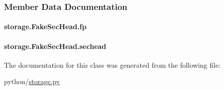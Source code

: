 \subsubsection{Member Data Documentation}
\hypertarget{classstorage_1_1FakeSecHead_a568fc1a21d55931188b7dbb77f93b094}{
\paragraph[{fp}]{\setlength{\rightskip}{0pt plus 5cm}storage.\-Fake\-Sec\-Head.\-fp}}\label{classstorage_1_1FakeSecHead_a568fc1a21d55931188b7dbb77f93b094}
\hypertarget{classstorage_1_1FakeSecHead_a34480f5cc048c82a51c460155a64aad1}{
\paragraph[{sechead}]{\setlength{\rightskip}{0pt plus 5cm}storage.\-Fake\-Sec\-Head.\-sechead}}\label{classstorage_1_1FakeSecHead_a34480f5cc048c82a51c460155a64aad1}


The documentation for this class was generated from the following file\-:\begin{DoxyCompactItemize}
\item 
python/\hyperlink{storage_8py}{storage.\-py}\end{DoxyCompactItemize}
